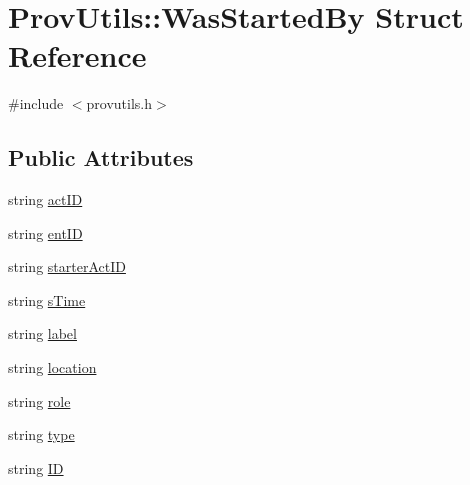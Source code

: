 \hypertarget{struct_prov_utils_1_1_was_started_by}{\section{Prov\-Utils\-:\-:Was\-Started\-By Struct Reference}
\label{struct_prov_utils_1_1_was_started_by}
}


{\ttfamily \#include $<$provutils.\-h$>$}

\subsection*{Public Attributes}
\begin{DoxyCompactItemize}
\item 
string \hyperlink{struct_prov_utils_1_1_was_started_by_ae8b03b355bd638b05e1d620cc377b0d8}{act\-I\-D}
\item 
string \hyperlink{struct_prov_utils_1_1_was_started_by_adb3d10cac5d50a81bf898f7956158095}{ent\-I\-D}
\item 
string \hyperlink{struct_prov_utils_1_1_was_started_by_ae187cefa27b4729ca4f8c924788ff43c}{starter\-Act\-I\-D}
\item 
string \hyperlink{struct_prov_utils_1_1_was_started_by_a473cff86ed691f29812971c94f657a87}{s\-Time}
\item 
string \hyperlink{struct_prov_utils_1_1_was_started_by_af0c3aad51ecafe05eb4c6c97791ab5b1}{label}
\item 
string \hyperlink{struct_prov_utils_1_1_was_started_by_abeab143270034629e44f777701dc6792}{location}
\item 
string \hyperlink{struct_prov_utils_1_1_was_started_by_a6d17405f0c853dec1d882b9fe93033b5}{role}
\item 
string \hyperlink{struct_prov_utils_1_1_was_started_by_a03dcf675037a3f98c400f5426eeb7de6}{type}
\item 
string \hyperlink{struct_prov_utils_1_1_was_started_by_abfc4dca5a8c9fc33e1c810e5b9a5dc0f}{I\-D}
\end{DoxyCompactItemize}


